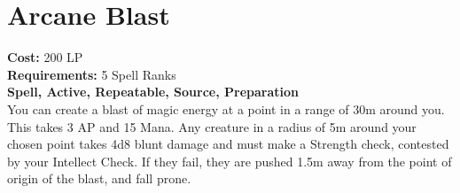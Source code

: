 \section{Arcane Blast}\label{spell:arcaneBlast}
\textbf{Cost:} 200 LP\\
\textbf{Requirements:} 5 Spell Ranks\\
\textbf{Spell, Active, Repeatable, Source, Preparation}\\
You can create a blast of magic energy at a point in a range of 30m around you.
This takes 3 AP and 15 Mana.
Any creature in a radius of 5m around your chosen point takes 4d8 blunt damage and must make a Strength check, contested by your Intellect Check.
If they fail, they are pushed 1.5m away from the point of origin of the blast, and fall prone.
